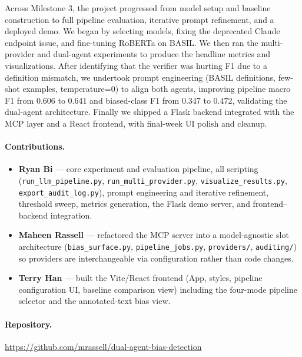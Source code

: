 \documentclass[11pt]{article}
\begin{document}
Across Milestone 3, the project progressed from model setup and baseline construction to full pipeline evaluation, iterative prompt refinement, and a deployed demo. We began by selecting models, fixing the deprecated Claude endpoint issue, and fine-tuning RoBERTa on BASIL. We then ran the multi-provider and dual-agent experiments to produce the headline metrics and visualizations. After identifying that the verifier was hurting F1 due to a definition mismatch, we undertook prompt engineering (BASIL definitions, few-shot examples, temperature{=}0) to align both agents, improving pipeline macro F1 from 0.606 to 0.641 and biased-class F1 from 0.347 to 0.472, validating the dual-agent architecture. Finally we shipped a Flask backend integrated with the MCP layer and a React frontend, with final-week UI polish and cleanup.

\paragraph{Contributions.}
\begin{itemize}
\itemsep0pt
\item \textbf{Ryan Bi} --- core experiment and evaluation pipeline, all scripting (\texttt{run\_llm\_pipeline.py}, \texttt{run\_multi\_provider.py}, \texttt{visualize\_results.py}, \texttt{export\_audit\_log.py}), prompt engineering and iterative refinement, threshold sweep, metrics generation, the Flask demo server, and frontend--backend integration.
\item \textbf{Maheen Rassell} --- refactored the MCP server into a model-agnostic slot architecture (\texttt{bias\_surface.py}, \texttt{pipeline\_jobs.py}, \texttt{providers/}, \texttt{auditing/}) so providers are interchangeable via configuration rather than code changes.
\item \textbf{Terry Han} --- built the Vite/React frontend (App, styles, pipeline configuration UI, baseline comparison view) including the four-mode pipeline selector and the annotated-text bias view.
\end{itemize}

\paragraph{Repository.} \url{https://github.com/mrassell/dual-agent-bias-detection}
\end{document}
